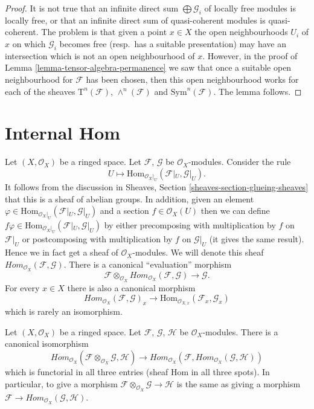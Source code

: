 \begin{proof}
It is not true that an infinite direct sum $\bigoplus \mathcal{G}_i$ of
locally free modules is locally free, or that an
infinite direct sum of quasi-coherent modules
is quasi-coherent. The problem is that given a
point $x \in X$ the open neighbourhoods $U_i$ of $x$ on which $\mathcal{G}_i$
becomes free (resp.\ has a suitable presentation) may have an intersection
which is not an open neighbourhood of $x$. However, in the
proof of Lemma \ref{lemma-tensor-algebra-permanence} we saw that
once a suitable open neighbourhood for $\mathcal{F}$ has been chosen,
then this open neighbourhood works for each of the sheaves
$\text{T}^n(\mathcal{F})$, $\wedge^n(\mathcal{F})$ and
$\text{Sym}^n(\mathcal{F})$.
The lemma follows.
\end{proof}







\section{Internal Hom}
\label{section-internal-hom}

\noindent
Let $(X, \mathcal{O}_X)$ be a ringed space.
Let $\mathcal{F}$, $\mathcal{G}$ be $\mathcal{O}_X$-modules.
Consider the rule
$$
U \longmapsto \text{Hom}_{\mathcal{O}_X|_U}(\mathcal{F}|_U, \mathcal{G}|_U).
$$
It follows from the discussion in Sheaves, Section
\ref{sheaves-section-glueing-sheaves} that this is a sheaf of
abelian groups. In addition, given an element
$\varphi \in \text{Hom}_{\mathcal{O}_X|_U}(\mathcal{F}|_U, \mathcal{G}|_U)$
and a section $f \in \mathcal{O}_X(U)$ then we can define
$f\varphi \in \text{Hom}_{\mathcal{O}_X|_U}(\mathcal{F}|_U, \mathcal{G}|_U)$
by either precomposing with multiplication by $f$ on $\mathcal{F}|_U$
or postcomposing with multiplication by $f$ on $\mathcal{G}|_U$ (it gives
the same result). Hence we in fact get a sheaf of $\mathcal{O}_X$-modules.
We will denote this sheaf
$\textit{Hom}_{\mathcal{O}_X}(\mathcal{F}, \mathcal{G})$.
There is a canonical ``evaluation'' morphism
$$
\mathcal{F}
\otimes_{\mathcal{O}_X}
\textit{Hom}_{\mathcal{O}_X}(\mathcal{F}, \mathcal{G})
\longrightarrow
\mathcal{G}.
$$
For every $x \in X$ there is also a canonical morphism
$$
\textit{Hom}_{\mathcal{O}_X}(\mathcal{F}, \mathcal{G})_x
\to
\text{Hom}_{\mathcal{O}_{X, x}}(\mathcal{F}_x, \mathcal{G}_x)
$$
which is rarely an isomorphism.

\begin{lemma}
\label{lemma-internal-hom}
Let $(X, \mathcal{O}_X)$ be a ringed space.
Let $\mathcal{F}$, $\mathcal{G}$, $\mathcal{H}$ be $\mathcal{O}_X$-modules.
There is a canonical isomorphism
$$
\textit{Hom}_{\mathcal{O}_X}
(\mathcal{F} \otimes_{\mathcal{O}_X} \mathcal{G}, \mathcal{H})
\longrightarrow
\textit{Hom}_{\mathcal{O}_X}
(\mathcal{F}, \textit{Hom}_{\mathcal{O}_X}(\mathcal{G}, \mathcal{H}))
$$
which is functorial in all three entries (sheaf Hom in
all three spots). In particular, to give a
morphism $\mathcal{F} \otimes_{\mathcal{O}_X} \mathcal{G} \to \mathcal{H}$
is the same as giving a morphism
$\mathcal{F} \to \textit{Hom}_{\mathcal{O}_X}(\mathcal{G}, \mathcal{H})$.
\end{lemma}

